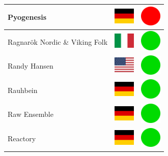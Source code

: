 \documentclass[12pt, a4paper, twoside]{report}
\begin{document}
\begin{center}
\begin{longtable}{|p{5cm}|p{2cm}|p{2cm}|}
Pyogenesis & \includegraphics[width=1cm]{4x3/de} & \includegraphics[width=1cm]{likes/n} \\ \hline
Ragnarök Nordic \& Viking Folk & \includegraphics[width=1cm]{4x3/it} & \includegraphics[width=1cm]{likes/y} \\ \hline
Randy Hansen & \includegraphics[width=1cm]{4x3/us} & \includegraphics[width=1cm]{likes/y} \\ \hline
Rauhbein & \includegraphics[width=1cm]{4x3/de} & \includegraphics[width=1cm]{likes/y} \\ \hline
Raw Ensemble & \includegraphics[width=1cm]{4x3/de} & \includegraphics[width=1cm]{likes/y} \\ \hline
Reactory & \includegraphics[width=1cm]{4x3/de} & \includegraphics[width=1cm]{likes/y} \\ \hline

\end{longtable}
\end{center}
\end{document}
